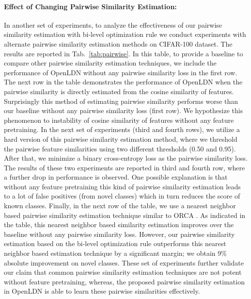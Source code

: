 \documentclass[runningheads]{eccv2022submission}
\begin{document}
\paragraph{\textbf{Effect of Changing Pairwise Similarity Estimation:}}
\label{par:alt_loss}
In another set of experiments, to analyze the effectiveness of our pairwise similarity estimation with bi-level optimization rule we conduct experiments with alternate pairwise similarity estimation methods on CIFAR-100 dataset. The results are reported in Tab.~\ref{tab:pairwise}. In this table, to provide a baseline to compare other pairwise similarity estimation techniques, we include the performance of OpenLDN without any pairwise similarity loss in the first row. The next row in the table demonstrates the performance of OpenLDN when the pairwise similarity is directly estimated from the cosine similarity of features. Surprisingly this method of estimating pairwise similarity performs worse than our baseline without any pairwise similarity loss (first row). We hypothesize this phenomenon to instability of cosine similarity of features without any feature pretraining. In the next set of experiments (third and fourth rows), we utilize a hard version of this pairwise similarity estimation method, where we threshold the pairwise feature similarities using two different thresholds (0.50 and 0.95). After that, we minimize a binary cross-entropy loss as the pairwise similarity loss. The results of these two experiments are reported in third and fourth row, where a further drop in performance is observed. One possible explanation is that without any feature pretraining this kind of pairwise similarity estimation leads to a lot of false positives (from novel classes) which in turn reduces the score of known classes. Finally, in the next row of the table, we use a nearest neighbor based pairwise similarity estimation technique similar to ORCA \cite{cao2022openworld}. As indicated in the table, this nearest neighbor based similarity estimation improves over the baseline without any pairwise similarity loss. However, our pairwise similarity estimation based on the bi-level optimization rule outperforms this nearest neighbor based estimation technique by a significant margin; we obtain 9\% absolute improvement on novel classes. These set of experiments further validate our claim that common pairwise similarity estimation techniques are not potent without feature pretraining, whereas, the proposed pairwise similarity estimation in OpenLDN is able to learn these pairwise similarities effectively.
\end{document}
